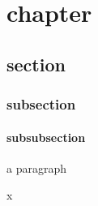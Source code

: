 \documentclass{scrbook}
\begin{document}
\pagestyle{empty}\renewcommand{}


\tableofcontents

\chapter{chapter}
\section{section}
\subsection{subsection}
\subsubsection{subsubsection}

    a paragraph\par x
   \tagmcend
 \tagstructend
\end{document}
